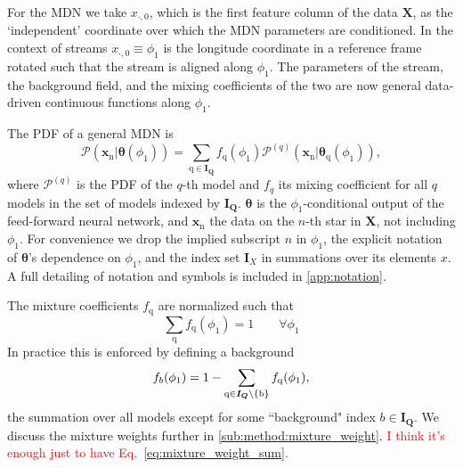 \documentclass[twocolumn]{aastex631}
\newcommand{\mrm}[1]{\mathrm{#1}}
\newcommand{\mbs}[1]{\boldsymbol{#1}}
\newcommand{\mbf}[1]{\mathbf{#1}}
\newcommand{\mcal}[1]{\mathcal{#1}}
\newcommand{\pdf}{\mcal{P}}
\newcommand{\prior}{\mcal{\pi}}
\newcommand{\nth}[1]{{#1}_{\mrm{n}}}  %
\newcommand{\qth}[1]{{#1}_{\mrm{q}}}  %
\newcommand{\smallcomponent}[2]{#2^{\scriptscriptstyle (#1)}}
\newcommand{\cmp}[2]{\smallcomponent{#1}{#2}}
\newcommand{\TODO}[1]{{\textcolor{red}{#1}}}
\newcommand{\JN}[1]{\TODO{#1}}
\begin{document}
        For the MDN we take $x_{\cdot, 0}$, which is the first feature column of
        the data $\mbf{X}$, as the `independent' coordinate over which the MDN
        parameters are conditioned. In the context of streams $x_{\cdot, 0}
        \equiv \phi_1$ is the longitude coordinate in a reference frame rotated
        such that the stream is aligned along $\phi_1$. The parameters of the
        stream, the background field, and the mixing coefficients of the two are
        now general data-driven continuous functions along $\phi_1$.

        The PDF of a general MDN is
        \begin{equation} \label{eq:general_mixture_network}
            \!\!\! \pdf(\nth{\mbs{x}} | \mbs{\theta}(\phi_1))
            \!=\! \sum_{\mrm{q} \in \mbs{I_Q}} \! \qth{f}(\phi_1) \cmp{q}{\pdf}(\nth{\mbs{x}}|\qth{\mbs{\theta}}(\phi_1)),
        \end{equation}
        where $\cmp{q}{\pdf}$ is the PDF of the $q$-th model and $f_q$ its
        mixing coefficient for all $q$ models in the set of models indexed by
        $\mbs{I_Q}$. $\mbs{\theta}$ is the $\phi_1$-conditional output of the
        feed-forward neural network, and $\nth{\mbs{x}}$ the data on the $n$-th
        star in $\mbs{X}$, not including $\phi_1$. For convenience we drop the
        implied subscript $n$ in $\phi_1$, the explicit notation of
        $\mbs{\theta}$'s dependence on $\phi_1$, and the index set $\mbs{I}_X$
        in summations over its elements $x$. A full detailing of notation and
        symbols is included in \autoref{app:notation}.

        The mixture coefficients $\qth{f}$ are normalized such that
        \begin{equation}
        \label{eq:mixture_weight_sum}
            \sum_{\mrm{q}} \qth{f}(\phi_1) = 1 \qquad \forall \phi_1
        \end{equation}
        In practice this is enforced by defining a background
        \begin{equation} \label{eq:mixture_weight_normalization}
            f_{b}(\phi_1) = 1 - \sum_{\rm{q}\in \mbs{I_Q}\backslash \{b\}} \qth{f}(\phi_1),
        \end{equation}
        the summation over all models except for some ``background" index $b \in
        \mbs{I_Q}$.  We discuss the mixture weights further in
        \autoref{sub:method:mixture_weight}. \JN{I think it's enough just to have Eq.~\ref{eq:mixture_weight_sum}.}
\end{document}
